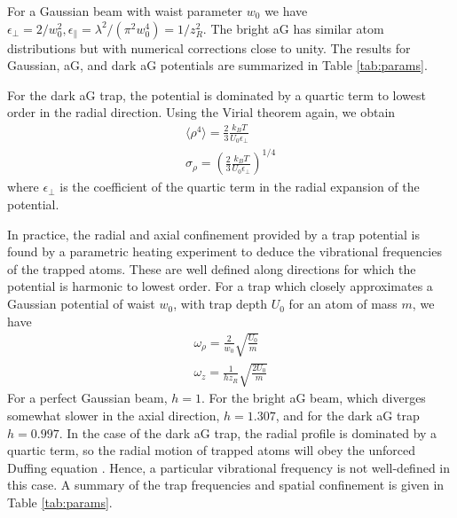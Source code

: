 For a Gaussian beam with waist parameter $w_0$ we have $\epsilon_{\perp}=2 / w_0^{2}, \epsilon_{\|}=\lambda^{2}/(\pi^{2} w_0^{4}) = 1/z_R^2$. The bright aG has similar atom distributions but with numerical corrections close to unity. The results for Gaussian, aG, and dark aG potentials are summarized in Table \ref{tab:params}.

For the dark aG trap, the potential is dominated by a quartic term to lowest order in the radial direction. Using the Virial theorem again, we obtain 
\begin{equation}
    \begin{gathered}
    \langle \rho^4 \rangle = \frac{2}{3}\frac{k_B T}{U_0 \epsilon_{\perp}}\\
    \sigma_{\rho} = \left(\frac{2}{3}\frac{k_B T}{U_0 \epsilon_{\perp}} \right)^{1/4}
    \end{gathered}
\end{equation}
where $\epsilon_{\perp}$ is the coefficient of the quartic term in the radial expansion of the potential.

In practice, the radial and axial confinement provided by a trap potential is found by a parametric heating experiment to deduce the vibrational frequencies of the trapped atoms. These are well defined along directions for which the potential is harmonic to lowest order. For a trap which closely approximates a Gaussian potential of waist $w_0$, with trap depth $U_0$ for an atom of mass $m$, we have 
\begin{equation}\label{eq:harmonic_freqs}
    \begin{gathered}
    \omega_{\rho} = \frac{2}{w_0}\sqrt{\frac{U_0}{m}}\\
    \omega_z = \frac{1}{h z_R}\sqrt{\frac{2 U_0}{m}}
    \end{gathered}
\end{equation}
For a perfect Gaussian beam, $h=1$. For the bright aG beam, which diverges somewhat slower in the axial direction, $h=1.307$, and for the dark aG trap $h=0.997$. In the case of the dark aG trap, the radial profile is dominated by a quartic term, so the radial motion of trapped atoms will obey the unforced Duffing equation \cite{Kovacic2011}. Hence, a particular vibrational frequency is not well-defined in this case. A summary of the trap frequencies and spatial confinement is given in Table \ref{tab:params}.

